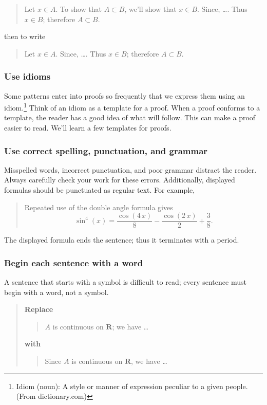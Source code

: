 \documentclass[12pt]{article}
\newcounter{ex}\setcounter{ex}{0}
\newcounter{id}\setcounter{id}{0}
\newcounter{se}\setcounter{se}{0}
\begin{document}
\begin{quote}
  Let $x \in A$.  To show that $ A \subset B$, we'll show that
  $x \in B$. Since, \dots. Thus $x \in B$; therefore $A \subset B$.
\end{quote}
then to write
\begin{quote}
  Let $x \in A$.  Since, \dots. Thus $x \in B$; therefore $A \subset B$.
\end{quote}

 \subsubsection{  Use idioms}

Some patterns enter into proofs so frequently that we express them
using an idiom.\footnote{Idiom (noun): A style or manner of expression
peculiar to a given people. (From dictionary.com)} Think of an idiom
as a template for a proof.  When a proof conforms to a template, the
reader has a good idea of what will follow.  This can make a proof easier to
read. We'll learn a few templates for proofs. 



 \subsubsection{  Use correct spelling, punctuation, and grammar}

Misspelled words, incorrect punctuation, and poor grammar distract the reader.  
Always carefully check your work for these errors. Additionally, 
displayed formulas should be punctuated as regular text.  For example,
\begin{quote}
Repeated use of the  double angle formula gives
\[
   \sin^4(x) = \frac {\cos \left(4\,x\right)}{8}-\frac {\cos \left(2\,x\right)}{2%
 }+\frac {3}{8}. 
\]
\end{quote}
The displayed formula ends the sentence; thus it terminates with a period.

 \subsubsection{  Begin each sentence with a word}  


A sentence that starts with a symbol is difficult to 
read; every sentence must begin with a word, not a symbol.

\begin{quote}
\textbf{\textbf{Replace}}
\begin{quote}
$A$ is continuous on $\mathbf{R}$; we have \dots
\end{quote}
\textbf{with}
\begin{quote}
Since $A$ is continuous on $\mathbf{R}$, we have \dots
\end{quote}
\end{quote}
\end{document}
